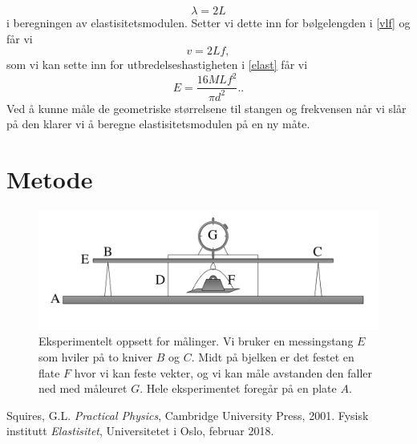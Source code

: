 \documentclass[%
 reprint,
 amsmath,amssymb,
 aps,
]{revtex4-1}
\begin{document}
\begin{equation}
  \lambda = 2L
\end{equation}i beregningen av elastisitetsmodulen. Setter vi dette inn for bølgelengden i \eqref{vlf} og får vi
\begin{equation}
  v = 2Lf,
\end{equation}som vi kan sette inn for utbredelseshastigheten i \eqref{elast} får vi
\begin{equation}
  E = \frac{16MLf^2}{\pi d^2}.\label{young5}.
\end{equation}
Ved å kunne måle de geometriske størrelsene til stangen og frekvensen når vi slår på den klarer vi å beregne elastisitetsmodulen på en ny måte.
\section{Metode}
\begin{figure}
  \centering
  \includegraphics[scale=0.17]{oppsett.png}
  \caption{Eksperimentelt oppsett for målinger. Vi bruker en messingstang $E$ som hviler på to kniver $B$ og $C$. Midt på bjelken er det festet en flate $F$ hvor vi kan feste vekter, og vi kan måle avstanden den faller ned med måleuret $G$. Hele eksperimentet foregår på en plate $A$.}
  \label{eksperiment}
\end{figure}
\begin{thebibliography}{9}
Squires, G.L. \emph{Practical Physics}, Cambridge University Press, 2001.
Fysisk institutt \emph{Elastisitet}, Universitetet i Oslo, februar 2018.
\end{thebibliography}
\end{document}
